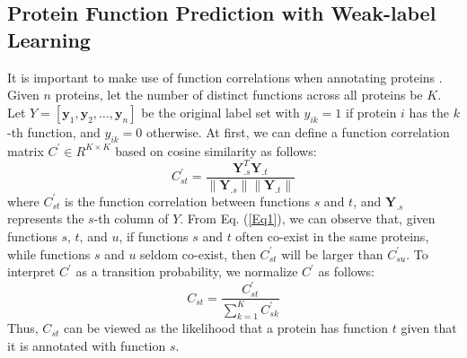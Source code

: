 \documentclass{llncs} %
\begin{document}
\subsection{Protein Function Prediction with Weak-label Learning}
It is important to make use of function correlations when annotating proteins \cite{jiang2011predicting,zhang2011framework}. Given $n$ proteins, let
the number of distinct functions across all proteins be $K$. Let
$Y=[\mathbf{y}_1,\mathbf{y}_2,\ldots,\mathbf{y}_n]$ be the original label set with $y_{ik}=1$ if protein $i$ has the $k$-th function, and $y_{ik}=0$ otherwise. At first, we can define a function correlation matrix $C^{'}\in R^{K\times K}$ based on cosine similarity as follows:
\begin{equation}
C^{'}_{st}=\frac{\mathbf{Y}_{.s}^{T}\mathbf{Y}_{.t}}{\|\mathbf{Y}_{.s}\|\|\mathbf{Y}_{.t}\|}
\label{Eq1}
\end{equation}
where $C^{'}_{st}$ is the function correlation between functions $s$ and $t$, and $\mathbf{Y}_{.s}$ represents the $s$-th column of $Y$. From Eq. (\ref{Eq1}), we can observe that, given functions $s$, $t$, and $u$, if functions $s$ and  $t$ often co-exist in the same proteins, while functions $s$ and $u$ seldom co-exist, then $C^{'}_{st}$ will be larger than $C^{'}_{su}$. To interpret $C^{'}$ as a transition probability, we normalize $C^{'}$  as follows:
\begin{equation}
C_{st}=\frac{C^{'}_{st}}{\sum_{k=1}^{K} C^{'}_{sk}}
 \label{Eq2}
\end{equation}
Thus, $C_{st}$ can be viewed as the likelihood that a protein has function $t$ given that it is annotated with function $s$.
\end{document}
